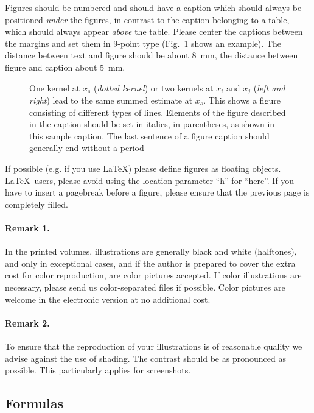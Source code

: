 \documentclass[a4paper]{llncs}
\begin{document}
Figures should be numbered and should have a caption which should
always be positioned {\it under} the figures, in contrast to the caption
belonging to a table, which should always appear {\it above} the table.
Please center the captions between the margins and set them in
9-point type
(Fig.~\ref{fig:example} shows an example).
The distance between text and figure should be about 8~mm, the
distance between figure and caption about 5~mm.
\begin{figure}
\centerline{}
\caption{One kernel at $x_s$ ({\it dotted kernel}) or two kernels at
$x_i$ and $x_j$ ({\it left and right}) lead to the same summed estimate
at $x_s$. This shows a figure consisting of different types of
lines. Elements of the figure described in the caption should be set in
italics,
in parentheses, as shown in this sample caption. The last
sentence of a figure caption should generally end without a period}
\label{fig:example}
\end{figure}

If possible (e.g. if you use \LaTeX) please define figures as floating
objects. \LaTeX\ users, please avoid using the location
parameter ``h'' for ``here''. If you have to insert a pagebreak before a
figure, please ensure that the previous page is completely filled.


\paragraph{Remark 1.}

In the printed volumes, illustrations are generally black and white
(halftones), and only in exceptional cases, and if the author is
prepared
to cover the extra cost for color reproduction, are color pictures
accepted. If color illustrations are necessary, please send us
color-separated files if possible.
Color pictures are welcome in the electronic version at no additional
cost.

\paragraph{Remark 2.}

To ensure that the reproduction of your illustrations is of reasonable
quality we advise against the use of shading. The contrast should be as
pronounced as possible. This particularly applies for screenshots.


\subsection{Formulas}
\end{document}
